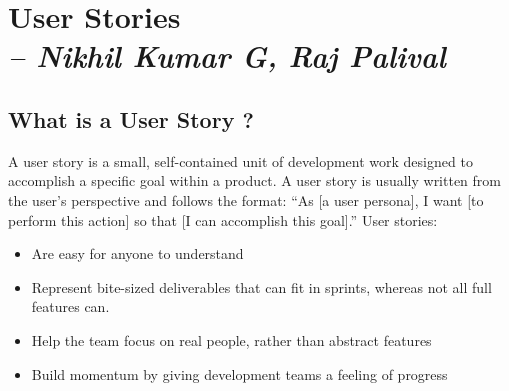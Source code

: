 \chapter{User Stories\\
\small{\textit{-- Nikhil Kumar G, Raj Palival}}
\label{Chapter::User Stories}}

\section{What is a User Story ? \label{Section::UserStoriesIntroduction}}
A user story is a small, self-contained unit of development work designed to accomplish a specific goal within a product. A user story is usually written from the user’s perspective and follows the format: “As [a user persona], I want [to perform this action] so that [I can accomplish this goal].”\newline
\newline
User stories:
\begin{itemize}
\item Are easy for anyone to understand
\item Represent bite-sized deliverables that can fit in sprints, whereas not all full features can. 
\item Help the team focus on real people, rather than abstract features
\item Build momentum by giving development teams a feeling of progress
\end{itemize}
